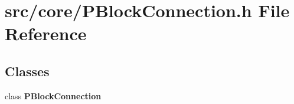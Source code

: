 \section{src/core/PBlock\-Connection.h File Reference}
\label{PBlockConnection_8h}


\subsection*{Classes}
\begin{CompactItemize}
\item 
class {\bf PBlock\-Connection}
\end{CompactItemize}
